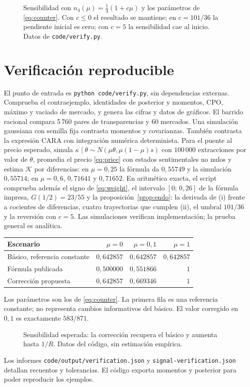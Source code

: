 \documentclass[11pt]{article}
\newcommand{\K}{\mathcal K}
\begin{document}
\begin{figure}[ht]
\centering

\caption{Sensibilidad con $n_4(\mu)=\tfrac14(1+c\mu)$ y los parámetros de
\eqref{eq:counter}. Con $c\leq0$ el resultado se mantiene; en $c=101/36$
la pendiente inicial es cero; con $c=5$ la sensibilidad cae al inicio.
Datos de \texttt{code/verify.py}.}
\end{figure}

\section{Verificación reproducible}
El punto de entrada es \texttt{python code/verify.py}, sin dependencias
externas. Comprueba el contraejemplo, identidades de posterior y momentos,
CPO, máximo y vaciado de mercado, y genera las cifras y datos de gráficos.
El barrido racional compara 5\,760 pares de transparencias y 60 mercados.
Una simulación gaussiana con semilla fija contrasta momentos y covarianzas.
También contrasta la expresión CARA con integración numérica determinista.
Para el puente al precio esperado, simula
$\kappa\mid\theta\sim N(\mu\theta,\mu(1-\mu)s)$ con $100\,000$ extracciones
por valor de $\theta$, promedia el precio \eqref{eq:price} con estados
sentimentales no nulos y estima $\K$ por diferencias: en $\mu=0{,}25$ la
fórmula da $0{,}55749$ y la simulación $0{,}55714$; en $\mu=0{,}6$,
$0{,}71641$ y $0{,}71652$. En aritmética exacta, el script comprueba además
el signo de \eqref{eq:weight}, el intervalo $[0;\,0{,}26]$ de la fórmula
impresa, $G(1/2)=23/55$ y la proposición~\ref{prop:endo}: la derivada de
(i) frente a cocientes de diferencias, cuatro trayectorias que cumplen (ii),
el umbral $101/36$ y la reversión con $c=5$.
Las simulaciones verifican implementación; la prueba general es analítica.

\begin{center}
\begin{tabular}{lrrr}
\toprule
Escenario & $\mu=0$ & $\mu=0{,}1$ & $\mu=1$\\
\midrule
Básico, referencia constante & $0{,}642857$ & $0{,}642857$ & $0{,}642857$\\
Fórmula publicada & $0{,}500000$ & $0{,}551866$ & $1$\\
Corrección propuesta & $0{,}642857$ & $0{,}669346$ & $1$\\
\bottomrule
\end{tabular}
\end{center}
Los parámetros son los de \eqref{eq:counter}. La primera fila es una
referencia constante; no representa cambios informativos del básico.
El valor corregido en $0{,}1$ es exactamente $583/871$.
\begin{figure}[ht]
\centering

\caption{Sensibilidad esperada: la corrección recupera el básico y aumenta
hasta $1/R$. Datos del código, sin estimación empírica.}
\end{figure}
Los informes \texttt{code/output/verification.json} y
\texttt{signal-verification.json} detallan recuentos y tolerancias.
El código exporta momentos y posterior para poder reproducir los ejemplos.
\end{document}
